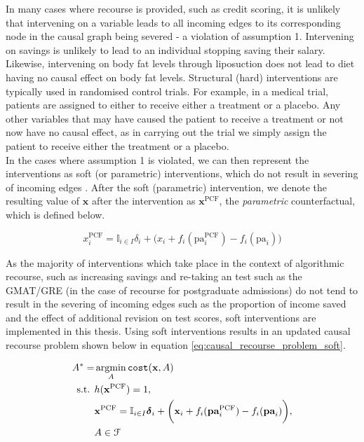 In many cases where recourse is provided, such as credit scoring, it is unlikely that intervening on a variable leads to all incoming edges to its corresponding node in the causal graph being severed - a violation of assumption 1. Intervening on savings is unlikely to lead to an individual stopping saving their salary. Likewise, intervening on body fat levels through liposuction does not lead to diet having no causal effect on body fat levels. Structural (hard) interventions are typically used in randomised control trials. For example, in a medical trial, patients are assigned to either to receive either a treatment or a placebo. Any other variables that may have caused the patient to receive a treatment or not now have no causal effect, as in carrying out the trial we simply assign the patient to receive either the treatment or a placebo.\\

In the cases where assumption 1 is violated, we can then represent the interventions as soft (or parametric) interventions, which do not result in severing of incoming edges \citep{eberhardtInterventionsCausalInference2007}. After the soft (parametric) intervention, we denote the resulting value of $\mathbf{x}$ after the intervention as $\mathbf{x}^{\text{PCF}}$, the \textit{parametric} counterfactual, which is defined below.

\begin{equation} \label{eq:soft_interventions}
	x^{\text{PCF}}_i = \mathbb{I}_{i \in I} \delta_i + \bigg( x_i + f_i(\text{pa}^{\text{PCF}}_i) - f_i(\text{pa}_i) \bigg)
\end{equation}

As the majority of interventions which take place in the context of algorithmic recourse, such as increasing savings and re-taking an test such as the GMAT/GRE (in the case of recourse for postgraduate admissions) do not tend to result in the severing of incoming edges such as the proportion of income saved and the effect of additional revision on test scores, soft interventions are implemented in this thesis. Using soft interventions results in an updated causal recourse problem shown below in equation \ref{eq:causal_recourse_problem_soft}.

\begin{align} \label{eq:causal_recourse_problem_soft}
	A^* = & \operatorname*{argmin}_{A} \texttt{cost}(\mathbf{x}, A) \\ \nonumber
	\text{s.t. } & h(\mathbf{x}^{\text{PCF}}) = 1, \\ \nonumber
	& 	\mathbf{x}^{\text{PCF}} = \mathbb{I}_{i \in I} \boldsymbol{\delta}_i + \bigg( \mathbf{x}_i + f_i(\textbf{pa}^{\text{PCF}}_i) - f_i(\textbf{pa}_i) \bigg), \\ \nonumber
	& A \in \mathcal{F}
\end{align} 


